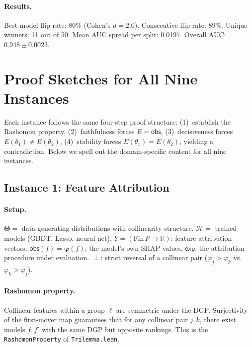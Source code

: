 \documentclass[11pt,a4paper]{article}
\newcommand{\R}{\mathbb{R}}
\newcommand{\Params}{\mathbf{\Theta}}
\newcommand{\sH}{\mathcal{H}}
\newcommand{\incomp}{\perp}
\begin{document}
\paragraph{Results.}
Best-model flip rate: 80\% (Cohen's $d = 2.0$).  Consecutive flip rate: 89\%.  Unique winners:
11 out of 50.  Mean AUC spread per split: 0.0197.  Overall AUC:
$0.948 \pm 0.0023$.

\section{Proof Sketches for All Nine Instances}
\label{app:proof-sketches}

Each instance follows the same four-step proof structure: (1)~establish the
Rashomon property, (2)~faithfulness forces $E = \mathsf{obs}$,
(3)~decisiveness forces $E(\theta_1) \neq E(\theta_2)$,
(4)~stability forces $E(\theta_1) = E(\theta_2)$, yielding a contradiction.
Below we spell out the domain-specific content for all nine instances.

\subsection{Instance 1: Feature Attribution}
\label{app:proof-attribution}

\paragraph{Setup.}
$\Params ={}$ data-generating distributions with collinearity structure.
$\sH ={}$ trained models (GBDT, Lasso, neural net).
$Y = (\mathrm{Fin}\,P \to \R)$: feature attribution vectors.
$\mathsf{obs}(f) = \boldsymbol{\varphi}(f)$: the model's own SHAP values.
$\mathsf{exp}$: the attribution procedure under evaluation.
$\incomp$: strict reversal of a collinear pair ($\varphi_j > \varphi_k$ vs.\
$\varphi_k > \varphi_j$).

\paragraph{Rashomon property.}
Collinear features within a group $\ell$ are symmetric under the DGP.
Surjectivity of the first-mover map guarantees that for any collinear pair
$j, k$, there exist models $f, f'$ with the same DGP but opposite rankings.
This is the \texttt{RashomonProperty} of \texttt{Trilemma.lean}.
\end{document}
